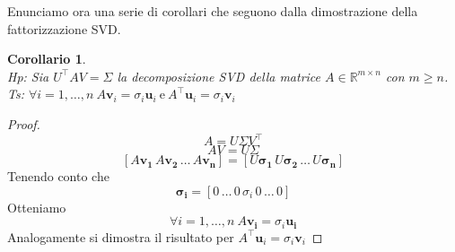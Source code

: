 \documentclass[11pt]{article}
\newtheorem{corollary}{Corollario}
\newcommand{\R}{\mathbb{R}}
\begin{document}
\noindent
Enunciamo ora una serie di corollari che seguono dalla dimostrazione della fattorizzazione SVD.
\begin{corollary}\label{scomp}
\textbf{}\\
\textit{Hp:} Sia $U^\top      AV=\Sigma$ la decomposizione SVD della matrice $A\in \R^{m \times n}$ con $m \geq n$. \\
\textit{Ts:} $\forall i=1, \dots ,n \ A \mathbf{v}_i= \sigma_i \mathbf{u}_i \ \text{e} \ A^\top \mathbf{u}_i = \sigma_i \mathbf{v}_i$  
\end{corollary}
\begin{proof}
\[
A = U\Sigma V^\top       
\]
\[
AV = U\Sigma
\]
\[ 
[A\mathbf{v_1} \, A\mathbf{v_2} \, \dots \, A\mathbf{v_n}] = [U\mathbf{\sigma_1} \, U\mathbf{\sigma_2} \, \dots \, U\mathbf{\sigma_n}]
\]
Tenendo conto che 
\[
\mathbf{\sigma_i}=[0 \, \dots \, 0 \, \sigma_i \, 0 \, \dots \, 0]
\]
Otteniamo
$$\forall i=1,\dots,n\ A\mathbf{v_i}=\sigma_i\mathbf{u_i}
$$
Analogamente si dimostra il risultato per $A^\top       \mathbf{u}_i = \sigma_i \mathbf{v}_i$
\end{proof}
\end{document}
